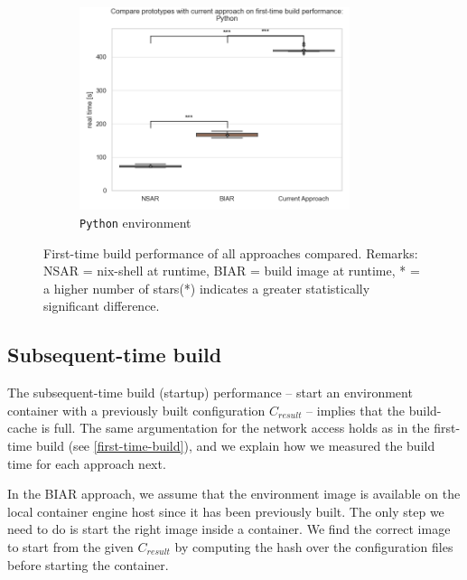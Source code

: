 \begin{figure}
    \vspace{1em}
    \begin{subfigure}{\textwidth}
    \centering
      \includegraphics[width=0.87\textwidth]{thesis/graphics/compare-plots/compare_prototypes_with_current_approach_on_first-time_build_performance:_python.png}
      \caption{\texttt{Python} environment}
      \label{fig:prototypes-vs-current-first-time-build-python}
    \end{subfigure}
    \caption{First-time build performance of all approaches compared. Remarks: NSAR = nix-shell at runtime, BIAR = build image at runtime, * = a higher number of stars(*) indicates a greater statistically significant difference.}
    \label{fig:prototypes-vs-current-first-time-build}
\end{figure}

\subsection{Subsequent-time build}\label{subsequent-time-build}
The subsequent-time build (startup) performance -- start an environment container with a previously built configuration $C_{result}$ -- implies that the build-cache is full. The same argumentation for the network access holds as in the first-time build (see \ref{first-time-build}), and we explain how we measured the build time for each approach next.

In the BIAR approach, we assume that the environment image is available on the local container engine host since it has been previously built. The only step we need to do is start the right image inside a container. We find the correct image to start from the given $C_{result}$ by computing the hash over the configuration files before starting the container. 

